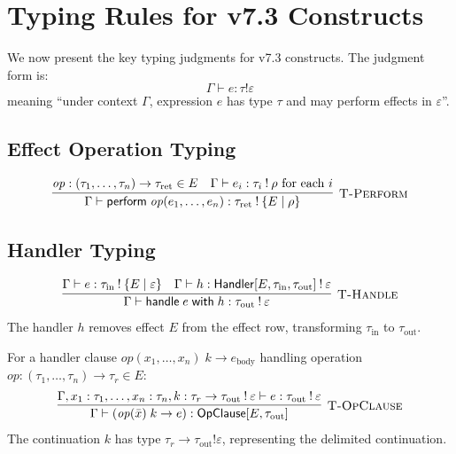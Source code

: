 \section{Typing Rules for v7.3 Constructs}
\label{sec:typing-rules}

We now present the key typing judgments for v7.3 constructs. The judgment form is:
\[
\Gamma \vdash e : \tau \mathbin{!} \varepsilon
\]
meaning ``under context $\Gamma$, expression $e$ has type $\tau$ and may perform effects in $\varepsilon$''.

\subsection{Effect Operation Typing}
\label{subsec:effect-op-typing}

\begin{definition}
\label{def:effect-op-rules}
\[
\infer[\textsc{T-Perform}]
  {\Gamma \vdash \mathsf{perform}\; \mathit{op}(e_1, \ldots, e_n) : \tau_{\mathrm{ret}} \mathbin{!} \{E \mid \rho\}}
  {
    \mathit{op} : (\tau_1, \ldots, \tau_n) \to \tau_{\mathrm{ret}} \in E &
    \Gamma \vdash e_i : \tau_i \mathbin{!} \rho \text{ for each } i
  }
\]
\end{definition}

\subsection{Handler Typing}
\label{subsec:handler-typing}

\begin{definition}
\label{def:handler-rules}
\[
\infer[\textsc{T-Handle}]
  {\Gamma \vdash \mathsf{handle}\; e\; \mathsf{with}\; h : \tau_{\mathrm{out}} \mathbin{!} \varepsilon}
  {
    \Gamma \vdash e : \tau_{\mathrm{in}} \mathbin{!} \{E \mid \varepsilon\} &
    \Gamma \vdash h : \mathsf{Handler}[E, \tau_{\mathrm{in}}, \tau_{\mathrm{out}}] \mathbin{!} \varepsilon
  }
\]
The handler $h$ removes effect $E$ from the effect row, transforming $\tau_{\mathrm{in}}$ to $\tau_{\mathrm{out}}$.
\end{definition}

\begin{definition}
\label{def:handler-clause}
For a handler clause $\mathit{op}(x_1, \ldots, x_n)\; k \to e_{\mathrm{body}}$ handling operation $\mathit{op} : (\tau_1, \ldots, \tau_n) \to \tau_r \in E$:
\[
\infer[\textsc{T-OpClause}]
  {\Gamma \vdash (\mathit{op}(\bar{x})\; k \to e) : \mathsf{OpClause}[E, \tau_{\mathrm{out}}]}
  {
    \Gamma, x_1 : \tau_1, \ldots, x_n : \tau_n, k : \tau_r \to \tau_{\mathrm{out}} \mathbin{!} \varepsilon
    \vdash e : \tau_{\mathrm{out}} \mathbin{!} \varepsilon
  }
\]
The continuation $k$ has type $\tau_r \to \tau_{\mathrm{out}} \mathbin{!} \varepsilon$, representing the delimited continuation.
\end{definition}


